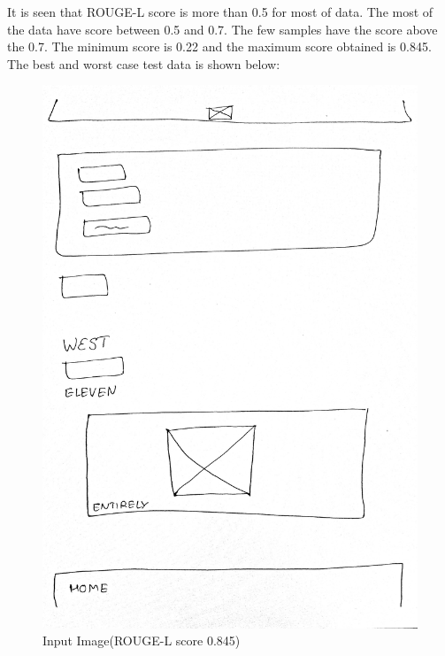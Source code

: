 It is seen that ROUGE-L score is more than 0.5 for most of data. The most of the data have score between 0.5 and 0.7. The few samples have the score above the 0.7. The minimum score is 0.22 and the maximum score obtained is 0.845. The best and worst case test data is shown below:
\begin{figure}[H]
    \includegraphics[scale=.1]{images/m22.jpg}
    \centering
    \caption{Input Image(ROUGE-L score 0.845)}
    \label{fig:m22}
\end{figure}

